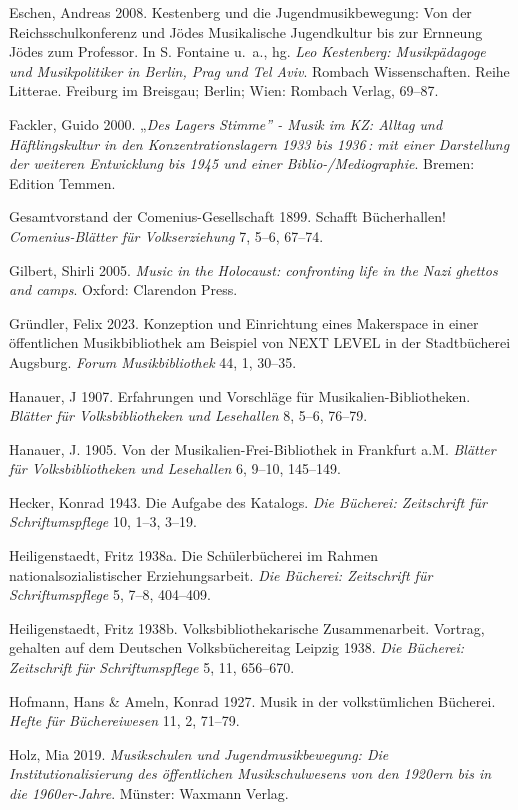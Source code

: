 \documentclass[a4paper,
fontsize=11pt,
oneside,
numbers=noperiodatend,
parskip=half-,
bibliography=totoc,
final
]{scrartcl}
\begin{document}
Eschen, Andreas 2008. Kestenberg und die Jugendmusikbewegung: Von der
Reichsschulkonferenz und Jödes Musikalische Jugendkultur bis zur
Ernneung Jödes zum Professor. In S. Fontaine u.~a., hg. \emph{Leo
Kestenberg: Musikpädagoge und Musikpolitiker in Berlin, Prag und Tel
Aviv}. Rombach Wissenschaften. Reihe Litterae. Freiburg im Breisgau;
Berlin; Wien: Rombach Verlag, 69--87.

Fackler, Guido 2000. „\emph{Des Lagers Stimme'' - Musik im KZ: Alltag
und Häftlingskultur in den Konzentrationslagern 1933 bis 1936\,: mit
einer Darstellung der weiteren Entwicklung bis 1945 und einer
Biblio-/Mediographie}. Bremen: Edition Temmen.

Gesamtvorstand der Comenius-Gesellschaft 1899. Schafft Bücherhallen!
\emph{Comenius-Blätter für Volkserziehung} 7, 5--6, 67--74.

Gilbert, Shirli 2005. \emph{Music in the Holocaust: confronting life in
the Nazi ghettos and camps}. Oxford: Clarendon Press.

Gründler, Felix 2023. Konzeption und Einrichtung eines Makerspace in
einer öffentlichen Musikbibliothek am Beispiel von NEXT LEVEL in der
Stadtbücherei Augsburg. \emph{Forum Musikbibliothek} 44, 1, 30--35.

Hanauer, J 1907. Erfahrungen und Vorschläge für Musikalien-Bibliotheken.
\emph{Blätter für Volksbibliotheken und Lesehallen} 8, 5--6, 76--79.

Hanauer, J. 1905. Von der Musikalien-Frei-Bibliothek in Frankfurt a.M.
\emph{Blätter für Volksbibliotheken und Lesehallen} 6, 9--10, 145--149.

Hecker, Konrad 1943. Die Aufgabe des Katalogs. \emph{Die Bücherei:
Zeitschrift für Schriftumspflege} 10, 1--3, 3--19.

Heiligenstaedt, Fritz 1938a. Die Schülerbücherei im Rahmen
nationalsozialistischer Erziehungsarbeit. \emph{Die Bücherei:
Zeitschrift für Schriftumspflege} 5, 7--8, 404--409.

Heiligenstaedt, Fritz 1938b. Volksbibliothekarische Zusammenarbeit.
Vortrag, gehalten auf dem Deutschen Volksbüchereitag Leipzig 1938.
\emph{Die Bücherei: Zeitschrift für Schriftumspflege} 5, 11, 656--670.

Hofmann, Hans \& Ameln, Konrad 1927. Musik in der volkstümlichen
Bücherei. \emph{Hefte für Büchereiwesen} 11, 2, 71--79.

Holz, Mia 2019. \emph{Musikschulen und Jugendmusikbewegung: Die
Institutionalisierung des öffentlichen Musikschulwesens von den 1920ern
bis in die 1960er-Jahre}. Münster: Waxmann Verlag.
\end{document}
